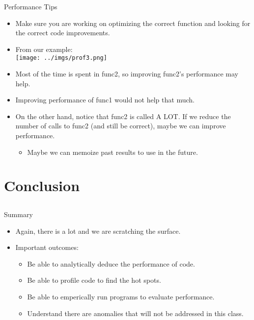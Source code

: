 \documentclass{beamer}
\begin{document}
\begin{frame}{Performance Tips}
\begin{itemize}
\item Make sure you are working on optimizing the correct function and looking for the correct code improvements.
\item From our example:\\
\texttt{[image: ../imgs/prof3.png]}
\item Most of the time is spent in func2, so improving func2's performance may help.
\item Improving performance of func1 would not help that much.
\item On the other hand, notice that func2 is called A LOT.  If we reduce the number of calls to func2 (and still be correct), maybe we can improve performance.
\begin{itemize}
\item Maybe we can memoize past results to use in the future.
\end{itemize}
\end{itemize}
\end{frame}

\section{Conclusion}
\subsection{}

\begin{frame}{Summary}
\begin{itemize}
\item Again, there is a lot and we are scratching the surface.
\item Important outcomes:
\begin{itemize}
\item Be able to analytically deduce the performance of code.
\item Be able to profile code to find the hot spots.
\item Be able to emperically run programs to evaluate performance.
\item Understand there are anomalies that will not be addressed in this class.
\end{itemize}
\end{itemize}
\end{frame}
\end{document}

